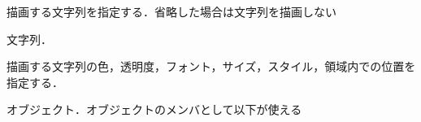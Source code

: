 \begin{description}
{\nopagebreak
\item[\texttt{Text}] \mbox{}
    \vspace{-1zw}
    \begin{description}
    \setlength{\itemsep}{-1.5\itemsep}
    \item[説明] 描画する文字列を指定する．省略した場合は文字列を描画しない
    \item[値] 文字列．
    \end{description}
}
\item[\texttt{Font}] \mbox{}
    \vspace{-1zw}
    \begin{description}
    \setlength{\itemsep}{-1.5\itemsep}
    \item[説明] 描画する文字列の色，透明度，フォント，サイズ，スタイル，領域内での位置を指定する．
    \item[値] オブジェクト．オブジェクトのメンバとして以下が使える


\end{description}
\end{description}
